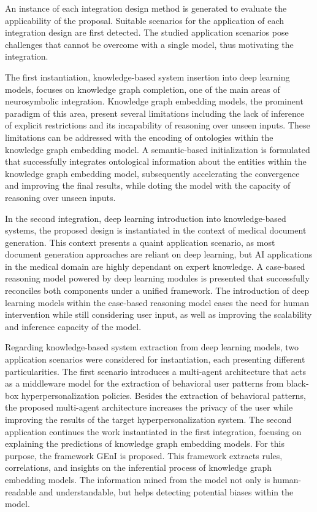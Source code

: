 An instance of each integration design method is generated to evaluate the applicability of the proposal. Suitable scenarios for the application of each integration design are first detected. The studied application scenarios pose challenges that cannot be overcome with a single model, thus motivating the integration. 

The first instantiation, knowledge-based system insertion into deep learning models, focuses on knowledge graph completion, one of the main areas of neurosymbolic integration. Knowledge graph embedding models, the prominent paradigm of this area, present several limitations including the lack of inference of explicit restrictions and its incapability of reasoning over unseen inputs. These limitations can be addressed with the encoding of ontologies within the knowledge graph embedding model. A semantic-based initialization is formulated that successfully integrates ontological information about the entities within the knowledge graph embedding model, subsequently accelerating the convergence and improving the final results, while doting the model with the capacity of reasoning over unseen inputs.

In the second integration, deep learning introduction into knowledge-based systems, the proposed design is instantiated in the context of medical document generation. This context presents a quaint application scenario, as most document generation approaches are reliant on deep learning, but AI applications in the medical domain are highly dependant on expert knowledge. A case-based reasoning model powered by deep learning modules is presented that successfully reconciles both components under a unified framework. The introduction of deep learning models within the case-based reasoning model eases the need for human intervention while still considering user input, as well as improving the scalability and inference capacity of the model. 

Regarding knowledge-based system extraction from deep learning models, two application scenarios were considered for instantiation, each presenting different particularities. The first scenario introduces a multi-agent architecture that acts as a middleware model for the extraction of behavioral user patterns from black-box hyperpersonalization policies. Besides the extraction of behavioral patterns, the proposed multi-agent architecture increases the privacy of the user while improving the results of the target hyperpersonalization system. The second application continues the work instantiated in the first integration, focusing on explaining the predictions of knowledge graph embedding models. For this purpose, the framework GEnI is proposed. This framework extracts rules, correlations, and insights on the inferential process of knowledge graph embedding models. The information mined from the model not only is human-readable and understandable, but helps detecting potential biases within the model. 

